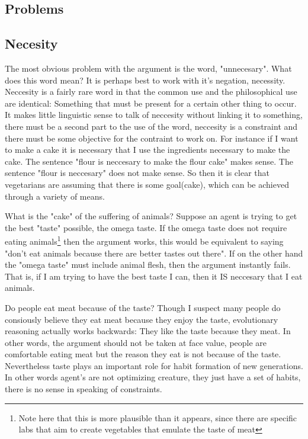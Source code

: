 \documentclass[12pt]{report}
\numberwithin{equation}{section}
\begin{document}
\subsection{Problems}

\subsection{Necesity}

The most obvious problem with the argument is the word, "unnecesary". What does this word mean? It is perhaps best to work with it's negation, necessity. Neccesity is a fairly rare word in that the common use and the philosophical use are identical: Something that must be present for a certain other thing to occur. It makes little linguistic sense to talk of neccesity without linking it to something, there must be a second part to the use of the word, neccesity is a constraint and there must be some objective for the contraint to work on. For instance if I want to make a cake it is necessary that I use the ingredients necessary to make the cake. The sentence "flour is neccesary to make the flour cake" makes sense. The sentence "flour is neccesary" does not make sense. So then it is clear that vegetarians are assuming that there is some goal(cake), which can be achieved through a variety of means. 

What is the "cake" of the suffering of animals? Suppose an agent is trying to get the best "taste" possible, the omega taste. If the omega taste does not require eating animals\footnote{Note here that this is more plausible than it appears, since there are specific labs that aim to create vegetables that emulate the taste of meat} then the argument works, this would be equivalent to saying "don't eat animals because there are better tastes out there". If on the other hand the "omega taste" must include animal flesh, then the argument instantly fails. That is, if I am trying to have the best taste I can, then it IS neccesary that I eat animals. 

Do people eat meat because of the taste? Though I suspect many people do consiously believe they eat meat because they enjoy the taste, evolutionary reasoning actually works backwards: They like the taste because they meat. In other words, the argument should not be taken at face value, people are comfortable eating meat but the reason they eat is not because of the taste. Nevertheless taste plays an important role for habit formation of new generations. In other words agent's are not optimizing creature, they just have a set of habits, there is no sense in speaking of constraints. 
\end{document}
